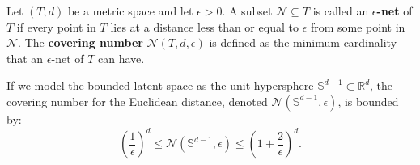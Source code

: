\documentclass[11pt, oneside, openany]{book}
\begin{document}
\begin{definition}
\label{def:4.3}
Let $(T, d)$ be a metric space and let $\epsilon > 0$. A subset $\mathcal{N} \subseteq T$ is called an \textbf{$\epsilon$-net} of $T$ if every point in $T$ lies at a distance less than or equal to $\epsilon$ from some point in $\mathcal{N}$. The \textbf{covering number} $\mathcal{N}(T, d, \epsilon)$ is defined as the minimum cardinality that an $\epsilon$-net of $T$ can have.
\end{definition}

\begin{proposition}
\label{prop:4.1}
If we model the bounded latent space as the unit hypersphere $\mathbb{S}^{d-1} \subset \mathbb{R}^{d}$, the covering number for the Euclidean distance, denoted $\mathcal{N}(\mathbb{S}^{d-1}, \epsilon)$, is bounded by:
\begin{equation}
\label{eq:4.14}
\left( \frac{1}{\epsilon} \right)^{d} \leq \mathcal{N}(\mathbb{S}^{d-1}, \epsilon) \leq \left( 1 + \frac{2}{\epsilon} \right)^{d}.
\end{equation}
\end{proposition}
\end{document}

